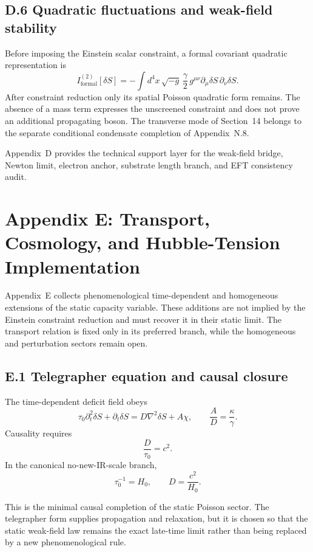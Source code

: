 \documentclass[11pt]{article}
\begin{document}
\subsection*{D.6 Quadratic fluctuations and weak-field stability}

Before imposing the Einstein scalar constraint, a formal covariant quadratic representation is
\[
I_{\mathrm{formal}}^{(2)}[\delta S]
=
-\int d^4x\,\sqrt{-g}\,
\frac{\gamma}{2}\,
g^{\mu\nu}\partial_\mu\delta S\,\partial_\nu\delta S.
\]
After constraint reduction only its spatial Poisson quadratic form remains. The absence of a mass term expresses the unscreened constraint and does not prove an additional propagating boson. The transverse mode of Section~14 belongs to the separate conditional condensate completion of Appendix~N.8.

Appendix~D provides the technical support layer for the weak-field bridge, Newton limit, electron anchor, substrate length branch, and EFT consistency audit.

\section*{Appendix E: Transport, Cosmology, and Hubble-Tension Implementation}

Appendix~E collects phenomenological time-dependent and homogeneous extensions of the static capacity variable. These additions are not implied by the Einstein constraint reduction and must recover it in their static limit. The transport relation is fixed only in its preferred branch, while the homogeneous and perturbation sectors remain open.

\subsection*{E.1 Telegrapher equation and causal closure}

The time-dependent deficit field obeys
\[
\tau_0\partial_t^2\delta S+\partial_t\delta S=D\nabla^2\delta S+A\chi,
\qquad
\frac{A}{D}=\frac{\kappa}{\gamma}.
\]
Causality requires
\[
\frac{D}{\tau_0}=c^2.
\]
In the canonical no-new-IR-scale branch,
\[
\tau_0^{-1}=H_0,
\qquad
D=\frac{c^2}{H_0}.
\]

This is the minimal causal completion of the static Poisson sector. The telegrapher form supplies propagation and relaxation, but it is chosen so that the static weak-field law remains the exact late-time limit rather than being replaced by a new phenomenological rule.
\end{document}
